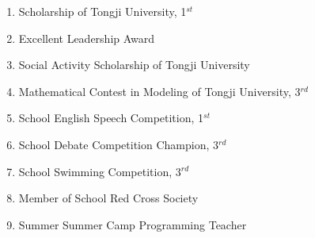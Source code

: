
\begin{enumerate}[label=(\roman*)]
    \item {Scholarship of Tongji University, 1$^{st}$}
    \item {Excellent Leadership Award}
    \item {Social Activity Scholarship of Tongji University}
    \item {Mathematical Contest in Modeling of Tongji University, 3$^{rd}$}
    \item {School English Speech Competition, 1$^{st}$}
    \item {School Debate Competition Champion, 3$^{rd}$}
    \item {School Swimming Competition, 3$^{rd}$}
    \item {Member of School Red Cross Society}
    \item {Summer Summer Camp Programming Teacher}
\end{enumerate}

